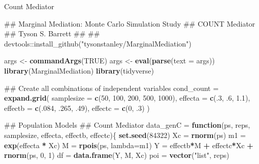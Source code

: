 \documentclass[]{DissertateCUNY}
\newenvironment{Shaded}{\begin{snugshade}}{\end{snugshade}}
\newcommand{\KeywordTok}[1]{\textcolor[rgb]{0.13,0.29,0.53}{\textbf{#1}}}
\newcommand{\DataTypeTok}[1]{\textcolor[rgb]{0.13,0.29,0.53}{#1}}
\newcommand{\DecValTok}[1]{\textcolor[rgb]{0.00,0.00,0.81}{#1}}
\newcommand{\FloatTok}[1]{\textcolor[rgb]{0.00,0.00,0.81}{#1}}
\newcommand{\StringTok}[1]{\textcolor[rgb]{0.31,0.60,0.02}{#1}}
\newcommand{\OtherTok}[1]{\textcolor[rgb]{0.56,0.35,0.01}{#1}}
\newcommand{\ControlFlowTok}[1]{\textcolor[rgb]{0.13,0.29,0.53}{\textbf{#1}}}
\newcommand{\OperatorTok}[1]{\textcolor[rgb]{0.81,0.36,0.00}{\textbf{#1}}}
\newcommand{\NormalTok}[1]{#1}
\begin{document}
\normalsize

Count Mediator

\small

\begin{Shaded}
\begin{Highlighting}[]
\NormalTok{## Marginal Mediation: Monte Carlo Simulation Study}
\NormalTok{##   COUNT Mediator}
\NormalTok{## Tyson S. Barrett}
\NormalTok{##}
\NormalTok{## devtools::install_github("tysonstanley/MarginalMediation")}

\NormalTok{args <-}\StringTok{ }\KeywordTok{commandArgs}\NormalTok{(}\OtherTok{TRUE}\NormalTok{)}
\NormalTok{args <-}\StringTok{ }\KeywordTok{eval}\NormalTok{(}\KeywordTok{parse}\NormalTok{(}\DataTypeTok{text =}\NormalTok{ args))}
\KeywordTok{library}\NormalTok{(MarginalMediation)}
\KeywordTok{library}\NormalTok{(tidyverse)}

\NormalTok{## Create all combinations of independent variables}
\NormalTok{cond_count =}\StringTok{ }\KeywordTok{expand.grid}\NormalTok{(}
  \DataTypeTok{samplesize =} \KeywordTok{c}\NormalTok{(}\DecValTok{50}\NormalTok{, }\DecValTok{100}\NormalTok{, }\DecValTok{200}\NormalTok{, }\DecValTok{500}\NormalTok{, }\DecValTok{1000}\NormalTok{),}
  \DataTypeTok{effecta    =} \KeywordTok{c}\NormalTok{(.}\DecValTok{3}\NormalTok{, .}\DecValTok{6}\NormalTok{, }\FloatTok{1.1}\NormalTok{),}
  \DataTypeTok{effectb    =} \KeywordTok{c}\NormalTok{(.}\DecValTok{084}\NormalTok{, .}\DecValTok{265}\NormalTok{, .}\DecValTok{49}\NormalTok{),}
  \DataTypeTok{effectc    =} \KeywordTok{c}\NormalTok{(}\DecValTok{0}\NormalTok{, .}\DecValTok{3}\NormalTok{)}
\NormalTok{)}

\NormalTok{## Population Models}
\NormalTok{## Count Mediator}
\NormalTok{data_genC =}\StringTok{ }\ControlFlowTok{function}\NormalTok{(ps, reps, samplesize, effecta, effectb, effectc)\{}
  \KeywordTok{set.seed}\NormalTok{(}\DecValTok{84322}\NormalTok{)}
\NormalTok{  Xc =}\StringTok{ }\KeywordTok{rnorm}\NormalTok{(ps)}
\NormalTok{  m1 =}\StringTok{ }\KeywordTok{exp}\NormalTok{(effecta }\OperatorTok{*}\StringTok{ }\NormalTok{Xc)}
\NormalTok{  M  =}\StringTok{ }\KeywordTok{rpois}\NormalTok{(ps, }\DataTypeTok{lambda=}\NormalTok{m1)}
\NormalTok{  Y  =}\StringTok{ }\NormalTok{effectb}\OperatorTok{*}\NormalTok{M }\OperatorTok{+}\StringTok{ }\NormalTok{effectc}\OperatorTok{*}\NormalTok{Xc }\OperatorTok{+}\StringTok{ }\KeywordTok{rnorm}\NormalTok{(ps, }\DecValTok{0}\NormalTok{, }\DecValTok{1}\NormalTok{)}
\NormalTok{  df =}\StringTok{ }\KeywordTok{data.frame}\NormalTok{(Y, M, Xc)}
\NormalTok{  poi  =}\StringTok{ }\KeywordTok{vector}\NormalTok{(}\StringTok{"list"}\NormalTok{, reps)}
  

\end{Highlighting}
\end{Shaded}
\end{document}
